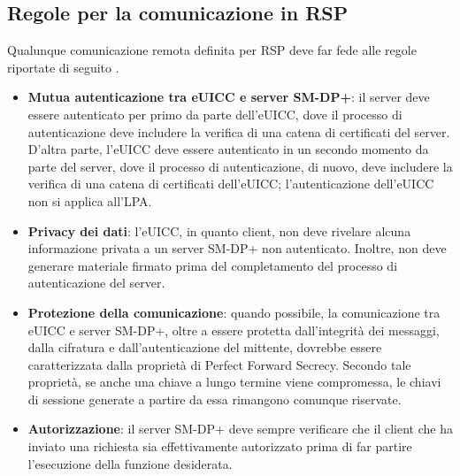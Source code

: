 \documentclass[10pt, twoside, openany]{book}
\begin{document}
\subsection{Regole per la comunicazione in RSP}
Qualunque comunicazione remota definita per RSP deve far fede alle regole riportate di seguito \cite{GSMA-docs-new}.
\begin{itemize}
\item \textbf{Mutua autenticazione tra eUICC e server SM-DP+}: il server deve essere autenticato per primo da parte dell'eUICC, dove il processo di autenticazione deve includere la verifica di una catena di certificati del server. D'altra parte, l'eUICC deve essere autenticato in un secondo momento da parte del server, dove il processo di autenticazione, di nuovo, deve includere la verifica di una catena di certificati dell'eUICC; l'autenticazione dell'eUICC non si applica all'LPA.
\item \textbf{Privacy dei dati}: l'eUICC, in quanto client, non deve rivelare alcuna informazione privata a un server SM-DP+ non autenticato. Inoltre, non deve generare materiale firmato prima del completamento del processo di autenticazione del server.
\item \textbf{Protezione della comunicazione}: quando possibile, la comunicazione tra eUICC e server SM-DP+, oltre a essere protetta dall'integrità dei messaggi, dalla cifratura e dall'autenticazione del mittente, dovrebbe essere caratterizzata dalla proprietà di Perfect Forward Secrecy. Secondo tale proprietà, se anche una chiave a lungo termine viene compromessa, le chiavi di sessione generate a partire da essa rimangono comunque riservate.
\item \textbf{Autorizzazione}: il server SM-DP+ deve sempre verificare che il client che ha inviato una richiesta sia effettivamente autorizzato prima di far partire l'esecuzione della funzione desiderata.
\end{itemize}
\end{document}
